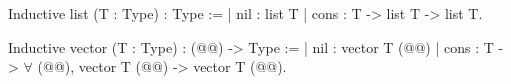 Inductive list (T : Type) : Type :=
| nil : list T
| cons :
    T -> list T -> list T.

Inductive vector (T : Type) : (@@) -> Type :=
| nil : vector T (@@)
| cons :
    T -> $\forall$ (@@), vector T (@@) -> vector T (@@).
